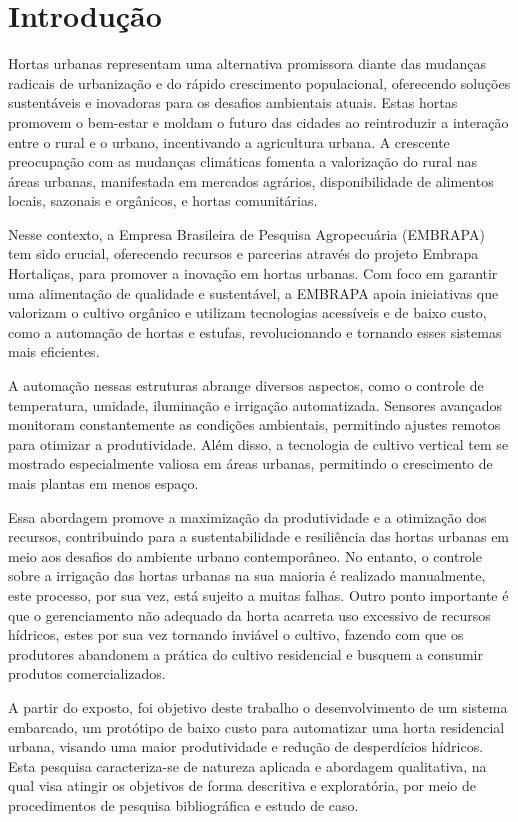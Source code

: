 \documentclass[%
  article,%
  a4paper,%
  12pt,%
  fleqn,%
  oneside,%
  chapter = TITLE,%
  section = TITLE,%
]{abntex2}
\begin{document}
\textual%
\newpage
\section{Introdução}\label{sec:intro}

Hortas urbanas representam uma alternativa promissora diante das mudanças radicais de urbanização e do rápido crescimento populacional, oferecendo soluções sustentáveis e inovadoras para os desafios ambientais atuais. Estas hortas promovem o bem-estar e moldam o futuro das cidades ao reintroduzir a interação entre o rural e o urbano, incentivando a agricultura urbana. A crescente preocupação com as mudanças climáticas fomenta a valorização do rural nas áreas urbanas, manifestada em mercados agrários, disponibilidade de alimentos locais, sazonais e orgânicos, e hortas comunitárias. 

Nesse contexto, a Empresa Brasileira de Pesquisa Agropecuária (EMBRAPA) tem sido crucial, oferecendo recursos e parcerias através do projeto Embrapa Hortaliças, para promover a inovação em hortas urbanas. Com foco em garantir uma alimentação de qualidade e sustentável, a EMBRAPA apoia iniciativas que valorizam o cultivo orgânico e utilizam tecnologias acessíveis e de baixo custo, como a automação de hortas e estufas, revolucionando e tornando esses sistemas mais eficientes.

A automação nessas estruturas abrange diversos aspectos, como o controle de temperatura, umidade, iluminação e irrigação automatizada. Sensores avançados monitoram constantemente as condições ambientais, permitindo ajustes remotos para otimizar a produtividade. Além disso, a tecnologia de cultivo vertical tem se mostrado especialmente valiosa em áreas urbanas, permitindo o crescimento de mais plantas em menos espaço.

 Essa abordagem promove a maximização da produtividade e a otimização dos recursos, contribuindo para a sustentabilidade e resiliência das hortas urbanas em meio aos desafios do ambiente urbano contemporâneo. No entanto, o controle sobre a irrigação das hortas urbanas na sua maioria é realizado manualmente, este processo, por sua vez, está sujeito a muitas falhas. Outro ponto importante é que o gerenciamento não adequado da horta acarreta uso excessivo de recursos hídricos, estes por sua vez tornando inviável o cultivo, fazendo com que os produtores abandonem a prática do cultivo residencial e busquem a consumir produtos comercializados.  
 
 A partir do exposto, foi objetivo deste trabalho o desenvolvimento de um sistema embarcado, um protótipo de baixo custo para automatizar uma horta  residencial urbana, visando uma maior produtividade e redução de desperdícios hídricos. Esta pesquisa caracteriza-se de natureza aplicada e abordagem qualitativa, na qual visa atingir os objetivos de forma descritiva e exploratória, por meio de procedimentos de pesquisa bibliográfica e estudo de caso.
\end{document}
